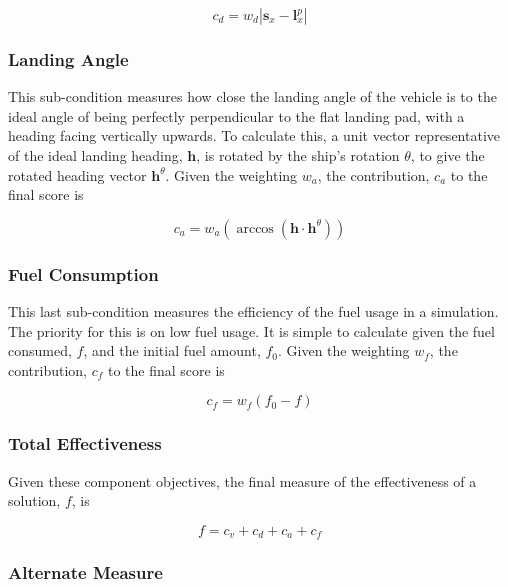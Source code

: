 \documentclass[conference]{IEEEtran}
\begin{document}
\begin{equation}
c_{d} = w_{d}|\boldsymbol {s}_{x} - \boldsymbol {l}_{x}^{p}|
\end{equation}

\subsubsection{Landing Angle}
This sub-condition measures how close the landing angle of the vehicle is to the ideal angle of being perfectly perpendicular to the flat landing pad, with a heading facing vertically upwards. To calculate this, a unit vector representative of the ideal landing heading, $\boldsymbol {h}$, is rotated by the ship's rotation $\theta$, to give the rotated heading vector $\boldsymbol {h}^{\theta}$. Given the weighting $w_{a}$, the contribution, $c_{a}$ to the final score is

\begin{equation}
c_{a} = w_{a}(\arccos(\boldsymbol {h} \cdot \boldsymbol {h}^{\theta}))
\end{equation}

\subsubsection{Fuel Consumption}
This last sub-condition measures the efficiency of the fuel usage in a simulation. The priority for this is on low fuel usage. It is simple to calculate given the fuel consumed, $f$, and the initial fuel amount, $f_{0}$. Given the weighting $w_{f}$, the contribution, $c_{f}$ to the final score is

\begin{equation}
c_{f} = w_{f}(f_{0} - f)
\end{equation}

\subsubsection{Total Effectiveness}
Given these component objectives, the final measure of the effectiveness of a solution, $f$, is

\begin{equation}
f = c_{v} + c_{d} + c_{a} + c_{f} 
\end{equation}

\subsubsection{Alternate Measure}
\end{document}

